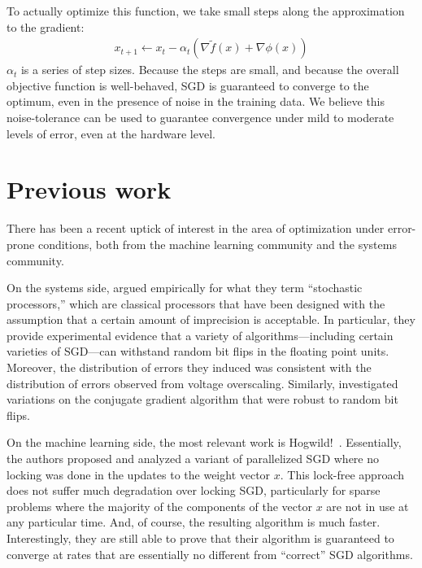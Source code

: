 \documentclass[12pt,leqno,twoside]{article}
\begin{document}
To actually optimize this function, we take small steps along the 
approximation to the gradient:
\begin{equation}
  \begin{split}
    x_{t+1} \gets x_t - \alpha_t \left ( \nabla \tilde f(x) + \nabla \phi(x)\right )
   \end{split}
 \end{equation}
$\alpha_t$ is a series of step sizes. Because the
steps are small, and because the overall objective function is
well-behaved, SGD is guaranteed to converge to the optimum, even
in the presence of noise in the training data. We believe this
noise-tolerance can be used to guarantee convergence under mild to
moderate levels of error, even at the hardware level.

\section{Previous work}

There has been a recent uptick of interest in the area of optimization
under error-prone conditions, both from the machine learning community
and the systems community. 

On the systems side, \citet{sartori11stochastic} argued empirically
for what they term ``stochastic processors,'' which are classical
processors that have been designed with the assumption that a certain
amount of imprecision is acceptable. In particular, they provide
experimental evidence that a variety of algorithms---including
certain varieties of SGD---can withstand random bit flips in the
floating point units. Moreover, the distribution of errors they
induced was consistent with the distribution of errors observed
from voltage overscaling. Similarly, \citet{oberil11numerical}
investigated variations on the conjugate gradient algorithm that
were robust to random bit flips.

On the machine learning side, the most relevant work is
Hogwild!~\citep{niu11hogwild}. Essentially, the authors proposed
and analyzed a variant of parallelized SGD where no locking was
done in the updates to the weight vector $x$. This lock-free approach
does not suffer much degradation over locking SGD,  particularly
for sparse problems where the majority of the components of the
vector $x$ are not in use at any particular time. And, of course,
the resulting algorithm is much faster.  Interestingly, they are
still able to prove that their algorithm is guaranteed to converge
at rates that are essentially no different from ``correct'' SGD
algorithms.
\end{document}
